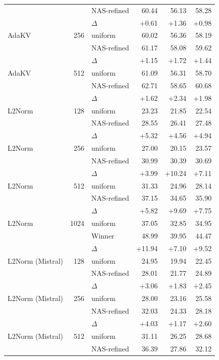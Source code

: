 \begin{table}[tp]
\begin{tabular}{@{}l r l r r r @{}}
     &  & NAS-refined & 60.44 & 56.13 & 58.28 \\
     &  & $\Delta$ & +0.61 & +1.36 & +0.98 \\
    \midrule
    AdaKV & 256 & uniform & 60.02 & 56.36 & 58.19 \\
     &  & NAS-refined & 61.17 & 58.08 & 59.62 \\
     &  & $\Delta$ & +1.15 & +1.72 & +1.44 \\
    \midrule
    AdaKV & 512 & uniform & 61.09 & 56.31 & 58.70 \\
     &  & NAS-refined & 62.71 & 58.65 & 60.68 \\
     &  & $\Delta$ & +1.62 & +2.34 & +1.98 \\
    \midrule
    L2Norm & 128 & uniform & 23.23 & 21.85 & 22.54 \\
     &  & NAS-refined & 28.55 & 26.41 & 27.48 \\
     &  & $\Delta$ & +5.32 & +4.56 & +4.94 \\
    \midrule
    L2Norm & 256 & uniform & 27.00 & 20.15 & 23.57 \\
     &  & NAS-refined & 30.99 & 30.39 & 30.69 \\
     &  & $\Delta$ & +3.99 & +10.24 & +7.11 \\
    \midrule
    L2Norm & 512 & uniform & 31.33 & 24.96 & 28.14 \\
     &  & NAS-refined & 37.15 & 34.65 & 35.90 \\
     &  & $\Delta$ & +5.82 & +9.69 & +7.75 \\
    \midrule
    L2Norm & 1024 & uniform & 37.05 & 32.85 & 34.95 \\
     &  & Winner & 48.99 & 39.95 & 44.47 \\
     &  & $\Delta$ & +11.94 & +7.10 & +9.52 \\
    \midrule
    L2Norm (Mistral) & 128 & uniform & 24.95 & 19.94 & 22.45 \\
     &  & NAS-refined & 28.01 & 21.77 & 24.89 \\
     &  & $\Delta$ & +3.06 & +1.83 & +2.45 \\
    \midrule
    L2Norm (Mistral) & 256 & uniform & 28.00 & 23.16 & 25.58 \\
     &  & NAS-refined & 32.03 & 24.33 & 28.18 \\
     &  & $\Delta$ & +4.03 & +1.17 & +2.60 \\
    \midrule
    L2Norm (Mistral) & 512 & uniform & 31.11 & 26.25 & 28.68 \\
     &  & NAS-refined & 36.39 & 27.86 & 32.12 \\

\end{tabular}
\end{table}

